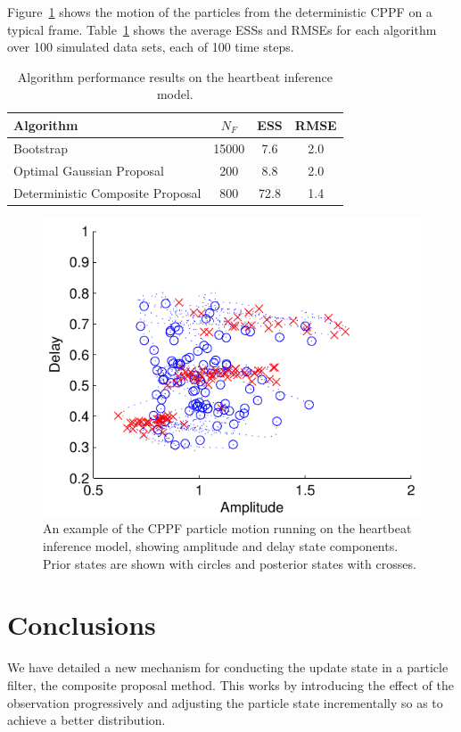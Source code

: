 \documentclass{article}
\begin{document}
Figure~\ref{fig:sineha_example_frame} shows the motion of the particles from the deterministic CPPF on a typical frame. Table~\ref{tab:sineha_results} shows the average ESSs and RMSEs for each algorithm over 100 simulated data sets, each of 100 time steps.
%
\begin{table}
\centering
\begin{tabular}{l||c|c|c}
Algorithm                                & $N_F$ & ESS  & RMSE \\
\hline
Bootstrap                                & 15000 &  7.6 &  2.0 \\
Optimal Gaussian Proposal                &   200 &  8.8 &  2.0 \\
Deterministic Composite Proposal         &   800 & 72.8 &  1.4 \\
\end{tabular}
\caption{Algorithm performance results on the heartbeat inference model.}
\label{tab:sineha_results}
\end{table}
%
\begin{figure}
\centering
\includegraphics[width=0.7\columnwidth]{sineha_example_frame.pdf}
\caption{An example of the CPPF particle motion running on the heartbeat inference model, showing amplitude and delay state components. Prior states are shown with circles and posterior states with crosses.}
\label{fig:sineha_example_frame}
\end{figure}



\section{Conclusions}

We have detailed a new mechanism for conducting the update state in a particle filter, the composite proposal method. This works by introducing the effect of the observation progressively and adjusting the particle state incrementally so as to achieve a better distribution.
\end{document}
